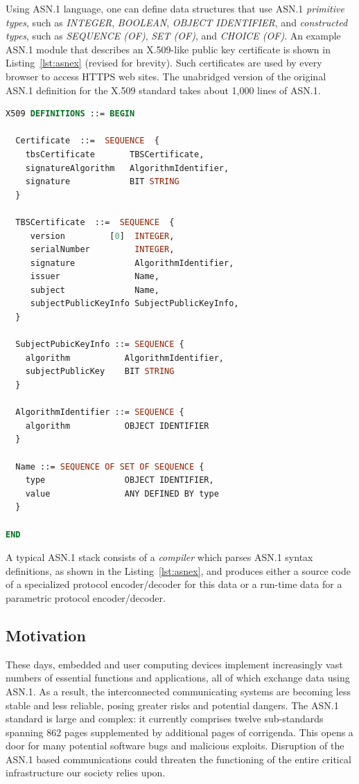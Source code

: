 \documentclass[10p,conference]{IEEEtran}
\begin{document}
Using ASN.1 language, one can define data structures that use
ASN.1 {\it primitive types}, such as \emph{INTEGER}, \emph{BOOLEAN}, \emph{OBJECT
IDENTIFIER}, and {\it constructed types}, such as \emph{SEQUENCE (OF)},
\emph{SET (OF)}, and \emph{CHOICE (OF)}. An example ASN.1 module that describes an X.509-like public key certificate is shown in Listing~\ref{lst:asnex} (revised for brevity). Such certificates are
used by every browser to access HTTPS web sites. The unabridged
version of the original ASN.1 definition for the X.509 standard takes
about 1,000 lines of ASN.1. 

\begin{lstlisting}[language=ASN1,label=lst:asnex,
  caption={ASN.1 example of X.509 certificates}]
X509 DEFINITIONS ::= BEGIN

  Certificate  ::=  SEQUENCE  {
    tbsCertificate       TBSCertificate,
    signatureAlgorithm   AlgorithmIdentifier,
    signature            BIT STRING
  }

  TBSCertificate  ::=  SEQUENCE  {
     version         [0]  INTEGER,
     serialNumber         INTEGER,
     signature            AlgorithmIdentifier,
     issuer               Name,
     subject              Name,
     subjectPublicKeyInfo SubjectPublicKeyInfo,
  }

  SubjectPubicKeyInfo ::= SEQUENCE {
    algorithm           AlgorithmIdentifier,
    subjectPublicKey    BIT STRING
  }

  AlgorithmIdentifier ::= SEQUENCE {
    algorithm           OBJECT IDENTIFIER
  }

  Name ::= SEQUENCE OF SET OF SEQUENCE {
    type                OBJECT IDENTIFIER,
    value               ANY DEFINED BY type
  }

END
\end{lstlisting}


A typical ASN.1 stack consists of a \textit{compiler} which parses
ASN.1 syntax definitions, as shown in the Listing~\ref{lst:asnex}, and
produces either a source code of a specialized protocol encoder/decoder for this data or a run-time data for a parametric protocol
encoder/decoder. 
  
\subsection{Motivation}

These days, embedded and user computing devices  implement increasingly vast numbers of essential functions and applications, all of which
exchange data using ASN.1. As a result, the interconnected communicating
systems are becoming less stable and less reliable, posing greater risks and
potential dangers. The ASN.1 standard is large and complex:
it currently comprises twelve sub-standards spanning 862 pages
supplemented by additional pages of corrigenda. This opens
a door for many potential software bugs and malicious exploits. Disruption of the ASN.1 based communications
could threaten the functioning of the entire critical infrastructure our
society relies upon. 
\end{document}
